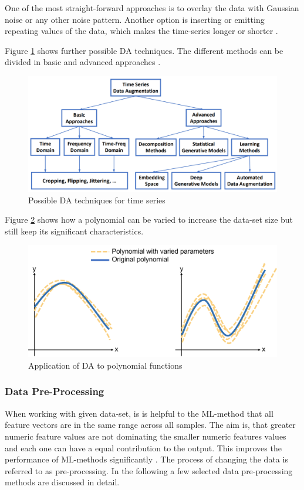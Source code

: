 One of the most straight-forward approaches is to overlay the data with Gaussian noise or any other noise pattern. Another option is inserting or emitting repeating values of the data, which makes the time-series longer or shorter \cite{Wen}.

Figure \ref{fig:DA} shows further possible DA techniques. The different methods can be divided in basic and advanced approaches \cite{Wen}.

\begin{figure}[H]
	\centering
	\includegraphics[width=0.9\linewidth]{IMGs/DA.png}
	\caption{Possible DA techniques for time series \cite{Wen}}
	\label{fig:DA}
\end{figure}

Figure \ref{fig:DA2} shows how a polynomial can be varied to increase the data-set size but still keep its significant characteristics.

\begin{figure}[H]
	\centering
	\includegraphics[width=0.8\linewidth]{IMGs/DA2.png}
	\caption{Application of DA to polynomial functions}
	\label{fig:DA2}
\end{figure}

\subsubsection*{Data Pre-Processing}
When working with given data-set, is is helpful to the ML-method that all feature vectors are in the same range across all samples.
The aim is, that greater numeric feature values are not dominating the smaller numeric features values and each one can have a equal contribution to the output. This improves the performance of ML-methods significantly \cite{Singh}. The process of changing the data is referred to as pre-processing. In the following a few selected data pre-processing methods are discussed in detail.

